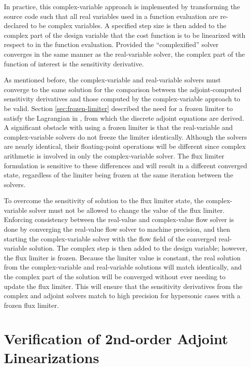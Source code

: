 In practice, this complex-variable approach is implemented by transforming the
source code such that all real variables used in a function evaluation are
re-declared to be complex variables.  A specified step size is then added to the
complex part of the design variable that the cost function is to be linearized
with respect to in the function evaluation.  Provided the ``complexified''
solver converges in the same manner as the real-variable solver, the complex
part of the function of interest is the sensitivity derivative.

As mentioned before, the complex-variable and real-variable solvers must
converge to the same solution for the comparison between the adjoint-computed
sensitivity derivatives and those computed by the complex-variable approach to
be valid.  Section \ref{sec:frozen-limiter} described the need for a frozen
limiter to satisfy the Lagrangian in , from which the discrete
adjoint equations are derived.  A significant obstacle with using a frozen
limiter is that the real-variable and complex-variable solvers do not freeze the
limiter identically.  Although the solvers are nearly identical, their
floating-point operations will be different since complex arithmetic is involved
in only the complex-variable solver.  The flux limiter formulation is sensitive
to these differences and will result in a different converged state, regardless
of the limiter being frozen at the same iteration between the solvers.  

To overcome the sensitivity of solution to the flux limiter state, the
complex-variable solver must not be allowed to change the value of the flux
limiter.  Enforcing consistency between the real-value and complex-value flow
solver is done by converging the real-value flow solver to machine precision,
and then starting the complex-variable solver with the flow field of the
converged real-variable solution.  The complex step is then added to the design
variable; however, the flux limiter is frozen.  Because the limiter value is
constant, the real solution from the complex-variable and real-variable
solutions will match identically, and the complex part of the solution will be
converged without ever needing to update the flux limiter.  This will ensure
that the sensitivity derivatives from the complex and adjoint solvers match to
high precision for hypersonic cases with a frozen flux limiter.

\section{Verification of 2nd-order Adjoint Linearizations}

